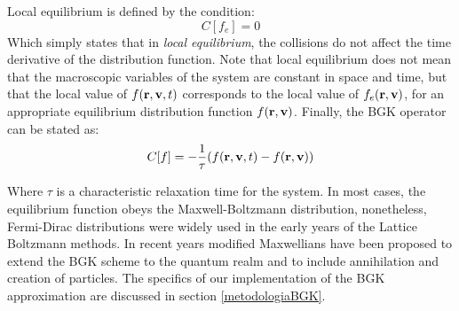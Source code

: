 Local equilibrium is defined by the condition:
\begin{equation}
C[f_e] = 0
\end{equation}
Which simply states that in \emph{local equilibrium}, the collisions do not affect the time derivative of the distribution function. Note that local equilibrium does not mean that the macroscopic variables of the system are constant in space and time, but that the local value of  $\f$ corresponds to the local value of $f_e(\rv)$, for an appropriate equilibrium distribution function $f(\rv)$. Finally, the BGK operator can be stated as:
\begin{equation}
C[f] = -\frac{1}{\tau}(\f - f(\rv))
\end{equation}


Where $\tau$ is a characteristic relaxation time for the system. In most cases, the equilibrium function obeys the Maxwell-Boltzmann distribution, nonetheless, Fermi-Dirac distributions were widely used in the early years of the Lattice Boltzmann methods.
In recent years modified Maxwellians have been proposed to extend the BGK scheme to the quantum realm\cite{2010arXiv1009.3352F} and to include annihilation and creation of particles. The specifics of our implementation of the BGK approximation are discussed in section \ref{metodologiaBGK}.











